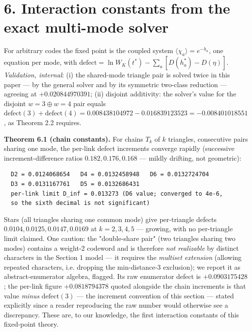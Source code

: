 \documentclass[11pt]{article}
\begin{document}
\section*{6. Interaction constants from the exact multi-mode solver}
For arbitrary codes the fixed point is the coupled system $\langle\chi_a\rangle = e^{-h_a}$, one equation per mode, with $\mathrm{defect} = \ln W_K(t^*) - \sum_a [D(h_a^*) - D(\eta)]$. \emph{Validation, internal}: (i) the shared-mode triangle pair is solved twice in this paper — by the general solver and by its symmetric two-class reduction — agreeing at $+0.020844970391$; (ii) disjoint additivity: the solver's value for the disjoint $w{=}3 \oplus w{=}4$ pair equals $\mathrm{defect}(3) + \mathrm{defect}(4) = 0.008438104972 - 0.016839123523 = -0.008401018551$, as Theorem 2.2 requires.

\textbf{Theorem 6.1 (chain constants).}  For chains $T_k$ of $k$ triangles, consecutive pairs sharing one mode, the per-link defect increments converge rapidly (successive increment-difference ratios $0.182, 0.176, 0.168$ — mildly drifting, not geometric):

\begin{small}\begin{verbatim}
  D2 = 0.0124068654   D4 = 0.0132458948   D6 = 0.0132724704
  D3 = 0.0131167761   D5 = 0.0132686431
  per-link limit D_inf = 0.013273 (D6 value; converged to 4e-6,
  so the sixth decimal is not significant)
\end{verbatim}\end{small}
Stars (all triangles sharing one common mode) give per-triangle defects $0.0104, 0.0125, 0.0147, 0.0169$ at $k = 2, 3, 4, 5$ — growing, with no per-triangle limit claimed.  One caution: the "double-share pair" (two triangles sharing two modes) contains a weight-2 codeword and is therefore \emph{not realizable} by distinct characters in the Section 1 model — it requires the \emph{multiset extension} (allowing repeated characters, i.e. dropping the min-distance-3 exclusion); we report it as abstract-enumerator algebra, flagged.  Its raw enumerator defect is $+0.0903175428$; the per-link figure $+0.0818794378$ quoted alongside the chain increments is that value \emph{minus} $\mathrm{defect}(3)$ — the increment convention of this section — stated explicitly since a reader reproducing the raw number would otherwise see a discrepancy. These are, to our knowledge, the first interaction constants of this fixed-point theory.
\end{document}
